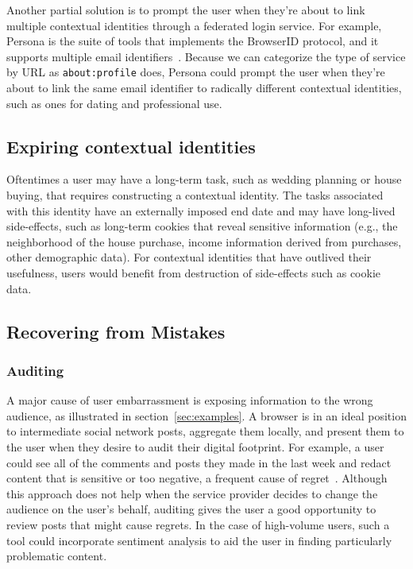 \documentclass[10pt, conference, compsocconf]{IEEEtran}
\begin{document}
Another partial solution is to prompt the user when they're about to link
multiple contextual identities through a federated login service. For example,
Persona is the suite of tools that implements the BrowserID protocol, and it
supports multiple email identifiers~\cite{browserid}.
Because we can categorize the type of service by URL
as \texttt{about:profile} does, Persona could prompt the user when they're about
to link the same email identifier to radically different contextual identities,
such as ones for dating and professional use.

\subsection{Expiring contextual identities}
Oftentimes a user may have a long-term task, such as wedding planning or house
buying, that requires constructing a contextual identity. The tasks associated
with this identity have an externally imposed end date and may have long-lived
side-effects, such as long-term cookies that reveal sensitive information
(e.g., the neighborhood of the house purchase, income information derived from
purchases, other demographic data). For contextual identities that have
outlived their usefulness, users would benefit from destruction of side-effects
such as cookie data.

\subsection{Recovering from Mistakes}
\subsubsection{Auditing}
A major cause of user embarrassment is exposing information to the wrong
audience, as illustrated in section~\ref{sec:examples}. A browser is in an
ideal position to intermediate social network posts, aggregate them locally,
and present them to the user when they desire to audit their digital footprint.
For example, a user could see all of the comments and posts they made in the
last week and redact content that is sensitive or too negative, a frequent cause
of regret~\cite{wang}.  Although this approach does not help when the service
provider decides to change the audience on the user's behalf, auditing gives
the user a good opportunity to review posts that might cause regrets. In the
case of high-volume users, such a tool could incorporate sentiment analysis to
aid the user in finding particularly problematic content.
\end{document}
